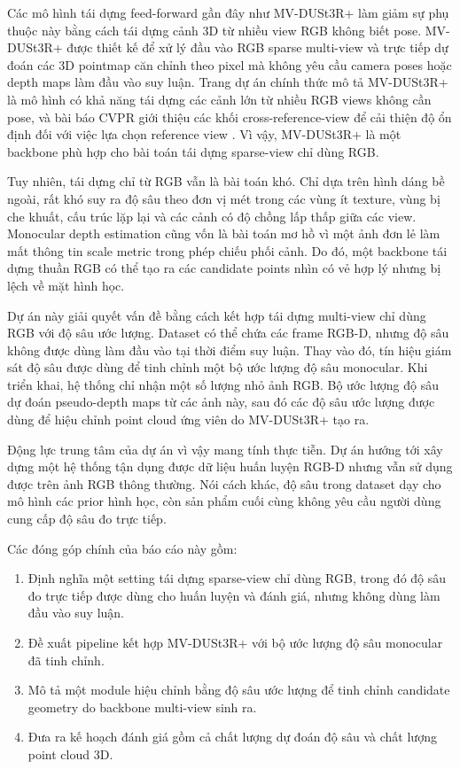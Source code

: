 \documentclass[12pt,a4paper]{article}
\newcommand{\mvdp}{MV-DUSt3R+}
\begin{document}
Các mô hình tái dựng feed-forward gần đây như \mvdp{} làm giảm sự phụ thuộc này bằng cách tái dựng cảnh 3D từ nhiều view RGB không biết pose. \mvdp{} được thiết kế để xử lý đầu vào RGB sparse multi-view và trực tiếp dự đoán các 3D pointmap căn chỉnh theo pixel mà không yêu cầu camera poses hoặc depth maps làm đầu vào suy luận. Trang dự án chính thức mô tả \mvdp{} là mô hình có khả năng tái dựng các cảnh lớn từ nhiều RGB views không cần pose, và bài báo CVPR giới thiệu các khối cross-reference-view để cải thiện độ ổn định đối với việc lựa chọn reference view \cite{mvdust3r_project,mvdust3r_paper}. Vì vậy, \mvdp{} là một backbone phù hợp cho bài toán tái dựng sparse-view chỉ dùng RGB.

Tuy nhiên, tái dựng chỉ từ RGB vẫn là bài toán khó. Chỉ dựa trên hình dáng bề ngoài, rất khó suy ra độ sâu theo đơn vị mét trong các vùng ít texture, vùng bị che khuất, cấu trúc lặp lại và các cảnh có độ chồng lấp thấp giữa các view. Monocular depth estimation cũng vốn là bài toán mơ hồ vì một ảnh đơn lẻ làm mất thông tin scale metric trong phép chiếu phối cảnh. Do đó, một backbone tái dựng thuần RGB có thể tạo ra các candidate points nhìn có vẻ hợp lý nhưng bị lệch về mặt hình học.

Dự án này giải quyết vấn đề bằng cách kết hợp tái dựng multi-view chỉ dùng RGB với độ sâu ước lượng. Dataset có thể chứa các frame RGB-D, nhưng độ sâu không được dùng làm đầu vào tại thời điểm suy luận. Thay vào đó, tín hiệu giám sát độ sâu được dùng để tinh chỉnh một bộ ước lượng độ sâu monocular. Khi triển khai, hệ thống chỉ nhận một số lượng nhỏ ảnh RGB. Bộ ước lượng độ sâu dự đoán pseudo-depth maps từ các ảnh này, sau đó các độ sâu ước lượng được dùng để hiệu chỉnh point cloud ứng viên do \mvdp{} tạo ra.

Động lực trung tâm của dự án vì vậy mang tính thực tiễn. Dự án hướng tới xây dựng một hệ thống tận dụng được dữ liệu huấn luyện RGB-D nhưng vẫn sử dụng được trên ảnh RGB thông thường. Nói cách khác, độ sâu trong dataset dạy cho mô hình các prior hình học, còn sản phẩm cuối cùng không yêu cầu người dùng cung cấp độ sâu đo trực tiếp.

Các đóng góp chính của báo cáo này gồm:
\begin{enumerate}[leftmargin=1.2cm]
    \item Định nghĩa một setting tái dựng sparse-view chỉ dùng RGB, trong đó độ sâu đo trực tiếp được dùng cho huấn luyện và đánh giá, nhưng không dùng làm đầu vào suy luận.
    \item Đề xuất pipeline kết hợp \mvdp{} với bộ ước lượng độ sâu monocular đã tinh chỉnh.
    \item Mô tả một module hiệu chỉnh bằng độ sâu ước lượng để tinh chỉnh candidate geometry do backbone multi-view sinh ra.
    \item Đưa ra kế hoạch đánh giá gồm cả chất lượng dự đoán độ sâu và chất lượng point cloud 3D.
\end{enumerate}
\end{document}
